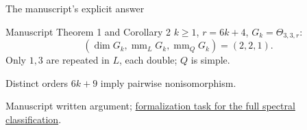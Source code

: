 \documentclass{beamer}
\begin{document}
\begin{frame}{The manuscript’s explicit answer}
\begin{block}{Manuscript Theorem 1 and Corollary 2}
$k\geq1$, $r=6k+4$, $G_k=\Theta_{3,3,r}$:
\[
(\dim G_k,\operatorname{mm}_L G_k,\operatorname{mm}_Q G_k)=(2,2,1).
\]
Only $1,3$ are repeated in $L$, each double; $Q$ is simple.
\end{block}
Distinct orders $6k+9$ imply pairwise nonisomorphism.

\small Manuscript written argument; \href{https://github.com/the-omega-institute/trureturing-requests/issues/39}{formalization task for the full spectral classification}.
\end{frame}
\end{document}
